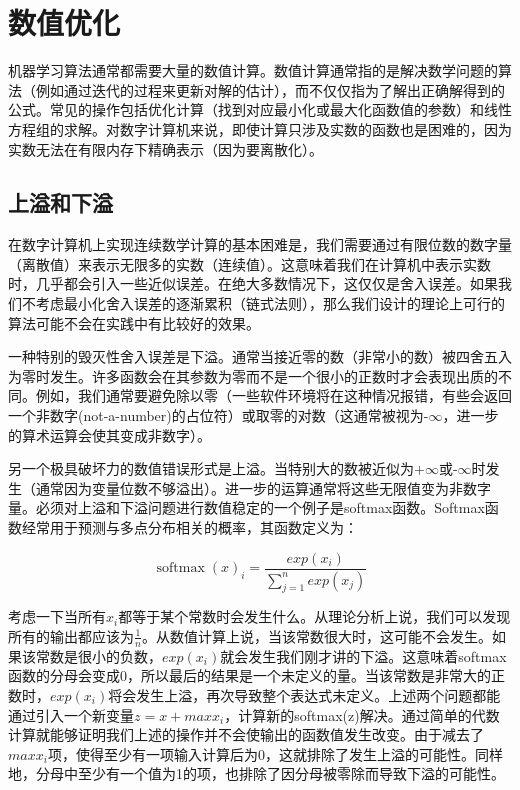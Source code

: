 ﻿%

\chapter{数值优化}
\label{chap:4}

    机器学习算法通常都需要大量的数值计算。数值计算通常指的是解决数学问题的算法（例如通过迭代的过程来更新对解的估计），而不仅仅指为了解出正确解得到的公式。常见的操作包括优化计算（找到对应最小化或最大化函数值的参数）和线性方程组的求解。对数字计算机来说，即使计算只涉及实数的函数也是困难的，因为实数无法在有限内存下精确表示（因为要离散化）。

\section{上溢和下溢}
    在数字计算机上实现连续数学计算的基本困难是，我们需要通过有限位数的数字量（离散值）来表示无限多的实数（连续值）。这意味着我们在计算机中表示实数时，几乎都会引入一些近似误差。在绝大多数情况下，这仅仅是舍入误差。如果我们不考虑最小化舍入误差的逐渐累积（链式法则），那么我们设计的理论上可行的算法可能不会在实践中有比较好的效果。

一种特别的毁灭性舍入误差是下溢。通常当接近零的数（非常小的数）被四舍五入为零时发生。许多函数会在其参数为零而不是一个很小的正数时才会表现出质的不同。例如，我们通常要避免除以零（一些软件环境将在这种情况报错，有些会返回一个非数字(not-a-number)的占位符）或取零的对数（这通常被视为-$\infty$，进一步的算术运算会使其变成非数字）。

另一个极具破坏力的数值错误形式是上溢。当特别大的数被近似为+$\infty$或-$\infty$时发生（通常因为变量位数不够溢出）。进一步的运算通常将这些无限值变为非数字量。必须对上溢和下溢问题进行数值稳定的一个例子是softmax函数。Softmax函数经常用于预测与多点分布相关的概率，其函数定义为：

\begin{equation}
	\mathop{\mathrm{softmax}}(x)_i=\frac{exp(x_i)}{\sum_{j=1}^nexp(x_j)}
\end{equation}

考虑一下当所有$x_i$都等于某个常数时会发生什么。从理论分析上说，我们可以发现所有的输出都应该为$\frac{1}{n}$。从数值计算上说，当该常数很大时，这可能不会发生。如果该常数是很小的负数，$exp(x_i)$就会发生我们刚才讲的下溢。这意味着softmax函数的分母会变成0，所以最后的结果是一个未定义的量。当该常数是非常大的正数时，$exp(x_i)$将会发生上溢，再次导致整个表达式未定义。上述两个问题都能通过引入一个新变量$z=x+maxx_i$，计算新的softmax(z)解决。通过简单的代数计算就能够证明我们上述的操作并不会使输出的函数值发生改变。由于减去了$maxx_i$项，使得至少有一项输入计算后为0，这就排除了发生上溢的可能性。同样地，分母中至少有一个值为1的项，也排除了因分母被零除而导致下溢的可能性。

